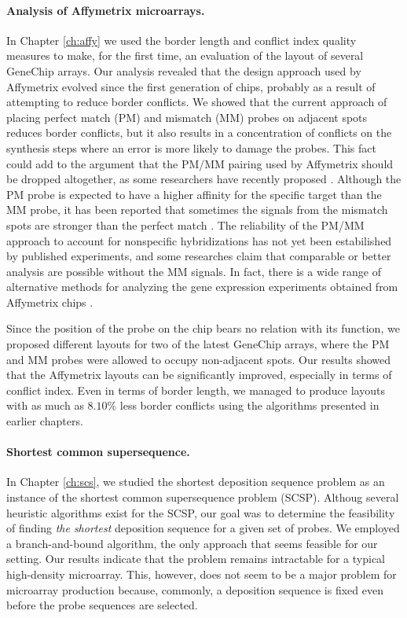 \paragraph{Analysis of Affymetrix microarrays.} In Chapter \ref{ch:affy} we used
the border length and conflict index quality measures to make, for the first time, an
evaluation of the layout of several GeneChip arrays. Our analysis
revealed that the design approach used by Affymetrix
evolved since the first generation of chips, probably as a result of attempting
to reduce border conflicts. We showed that the current approach of placing
perfect match (PM) and mismatch (MM) probes on adjacent spots reduces
border conflicts, but it also results in a concentration of
conflicts on the synthesis steps where an error is more likely to damage the
probes. This fact could add to the argument that the PM/MM pairing used by
Affymetrix should be dropped altogether, as some researchers have recently
proposed \citep{Lauren2003}. Although the PM probe is expected to have a higher
affinity for the specific target than the MM probe, it has been reported that
sometimes the signals from the mismatch spots are stronger than the perfect
match \citep{Naef2003}. The reliability of the PM/MM approach to account for
nonspecific hybridizations has not yet been estabilished by published
experiments, and some researches claim that comparable or better analysis are
possible without the MM signals. In fact, there is a wide range of alternative
methods for analyzing the gene expression experiments obtained from Affymetrix
chips \citep{Irizarry2006,Millenaar2006}.

Since the position of the probe on the chip bears no relation with its function,
we proposed different layouts for two of the latest GeneChip arrays, where the
PM and MM probes were allowed to occupy non-adjacent spots. Our results showed
that the Affymetrix layouts can be significantly improved, especially in terms
of conflict index. Even in terms of border length, we managed to produce layouts
with as much as $8.10\%$ less border conflicts using the algorithms presented in
earlier chapters.

\paragraph{Shortest common supersequence.}
In Chapter \ref{ch:scs}, we studied the shortest deposition sequence problem as
an instance of the shortest common supersequence problem (SCSP). Althoug several
heuristic algorithms exist for the SCSP, our goal was to determine the
feasibility of finding \emph{the shortest} deposition sequence for a given set
of probes. We employed a branch-and-bound algorithm, the only approach that
seems feasible for our setting. Our results indicate that the problem remains
intractable for a typical high-density microarray. This, however, does not seem
to be a major problem for microarray production because, commonly, a deposition
sequence is fixed even before the probe sequences are selected.

